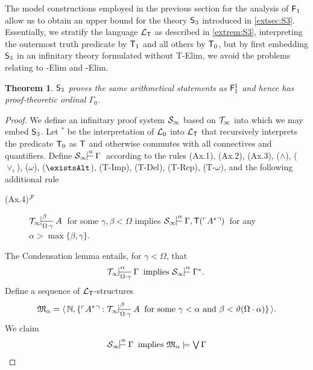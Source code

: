 \documentclass[UKenglish,cleveref,DIV=12]{scrartcl}
\let\exists\existsAlt
\newtheorem{theorem}{Theorem}
\theoremstyle{definition}
\theoremstyle{definition}
\begin{document}
The model constructions employed in the previous section for the analysis of $\mathsf{F}_1$
allow us to obtain an upper bound for the theory $\mathsf{S}_3$ introduced in
\cref{extsec:S3}. Essentially, we stratify the language $\mathcal{L}_{\mathsf{T}}$ as described in
\cref{extrem:S3}, interpreting the outermost truth predicate by $\mathsf{T}_1$ and all
others by $\mathsf{T}_0$, but by first embedding $\mathsf{S}_3$ in an infinitary theory
formulated without T-Elim, we avoid the problems relating to -Elim and
-Elim.
\begin{theorem}\label{extthm:S3strength}
 $\mathsf{S}_3$ proves the same arithmetical statements as $\mathsf{F}_1^1$ and hence has
proof-theoretic ordinal $\Gamma_0$.
\end{theorem}
\begin{proof}
We define an infinitary proof system $\mathcal{S}_\infty$ based on $\mathcal{T}_\infty$ into
which we may embed $\mathsf{S}_3$. Let $^*$ be the interpretation of $\mathcal{L}_0$ into
$\mathcal{L}_{\mathsf{T}}$ that recursively interprets the predicate $\mathsf{T}_0$ as $\mathsf{T}$ and otherwise
commutes with all connectives and quantifiers. Define $\theoryinf
S\prov\alpha{}\Gamma$ according to the rules (Ax.1), (Ax.2), (Ax.3),
($\land$), ($\lor_i$), ($\omega$), ($\exists$), (T-Imp), (T-Del), (T-Rep), (T-$\omega$), and
the following additional rule
\begin{description}
 \item [\normalfont(Ax.4)$^{\mathcal{F}}$] $\Tinfty\prov\beta{\Omega\cdot\gamma} A$ for some $\gamma,\beta<\Omega$
  implies $\theoryinf S\prov\alpha{}{\Gamma,\T(\gn{A^*})}$ for any \linebreak$\alpha>\max\{\beta,\gamma\}$.
\end{description}
The Condensation lemma entails, for $\gamma<\Omega$, that
\begin{align}\label{exteqn:S81}
  \Tinfty\prov\alpha{\Omega\cdot\gamma}\Gamma\text{ implies }\theoryinf S\prov\alpha{}{\Gamma^*.}
\end{align}
%
Define a sequence of $\mathcal{L}_{\mathsf{T}}$-structures
\begin{align*}
  \mathfrak{M}_\alpha=\pair{\N,\{\gn {A^*}:\text{$\Tinfty\prov{\beta}{\Omega\cdot\gamma} A$ for some $\gamma<\alpha$ and $\beta<\vartheta(\Omega\cdot\alpha)$}\}}.
\end{align*}
We claim
\begin{align}\label{exteqn:S82}
  \theoryinf S\prov\alpha{}\Gamma\text{ implies }\mathfrak{M}_\alpha\models\textstyle\bigvee\Gamma
\end{align}

\end{proof}
\end{document}
